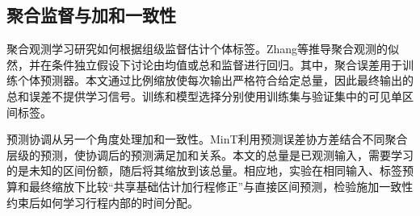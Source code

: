 \subsection{聚合监督与加和一致性}
聚合观测学习研究如何根据组级监督估计个体标签。Zhang等推导聚合观测的似然，并在条件独立假设下讨论由均值或总和监督进行回归\cite{zhang2020aggregate}。其中，聚合误差用于训练个体预测器。本文通过比例缩放使每次输出严格符合给定总量，因此最终输出的总和误差不提供学习信号。训练和模型选择分别使用训练集与验证集中的可见单区间标签。

预测协调从另一个角度处理加和一致性。MinT利用预测误差协方差结合不同聚合层级的预测，使协调后的预测满足加和关系\cite{wickramasuriya2019mint}。本文的总量是已观测输入，需要学习的是未知的区间份额，随后将其缩放到该总量。相应地，实验在相同输入、标签预算和最终缩放下比较“共享基础估计加行程修正”与直接区间预测，检验施加一致性约束后如何学习行程内部的时间分配。
